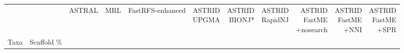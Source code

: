 \begin{table}[htb!]
    \centering
\begin{tabular}{llrrrrrrrrr}
\hline
     &  &  ASTRAL &    MRL &  FastRFS-enhanced &  \makecell{ASTRID\\UPGMA} &  \makecell{ASTRID\\BIONJ*} &  \makecell{ASTRID\\RapidNJ} &  \makecell{ASTRID\\FastME\\+nosearch} &  \makecell{ASTRID\\FastME\\+NNI} &  \makecell{ASTRID\\FastME\\+SPR} \\
Taxa & Scaffold \% &         &        &                   &               &                &                 &                         &                    &                    \\


\end{tabular}
\end{table}
